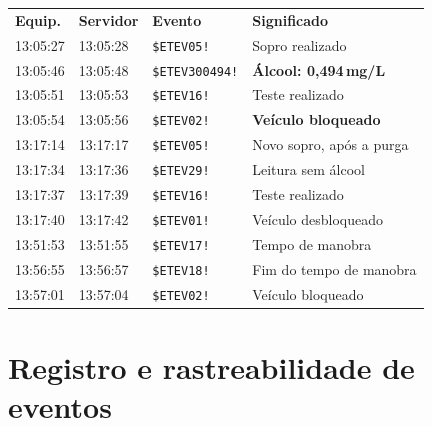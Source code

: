 \documentclass[a4paper,10pt]{article}
\newcommand{\thead}[1]{\textbf{\color{white}#1}}
\newcommand{\headrow}{\rowcolor{sdark}}
\begin{document}
\begin{multicols}{2}
\footnotesize
\begin{tabularx}{\linewidth}{@{}P{11.5mm}P{11.5mm}P{20mm}L@{}}
\headrow \thead{Equip.} & \thead{Servidor} & \thead{Evento} & \thead{Significado}\\
13:05:27 & 13:05:28 & \texttt{\$ETEV05!} & Sopro realizado\\
 13:05:46 & 13:05:48 & \texttt{\$ETEV300494!} & \textcolor{salert}{\textbf{Álcool: 0,494\,mg/L}}\\
13:05:51 & 13:05:53 & \texttt{\$ETEV16!} & Teste realizado\\
 13:05:54 & 13:05:56 & \texttt{\$ETEV02!} & \textbf{Veículo bloqueado}\\
13:17:14 & 13:17:17 & \texttt{\$ETEV05!} & Novo sopro, após a purga\\
 13:17:34 & 13:17:36 & \texttt{\$ETEV29!} & Leitura sem álcool\\
13:17:37 & 13:17:39 & \texttt{\$ETEV16!} & Teste realizado\\
 13:17:40 & 13:17:42 & \texttt{\$ETEV01!} & Veículo desbloqueado\\
13:51:53 & 13:51:55 & \texttt{\$ETEV17!} & Tempo de manobra\\
 13:56:55 & 13:56:57 & \texttt{\$ETEV18!} & Fim do tempo de manobra\\
13:57:01 & 13:57:04 & \texttt{\$ETEV02!} & Veículo bloqueado\\
\end{tabularx}
\normalsize
\end{multicols}

\section{Registro e rastreabilidade de eventos}
\end{document}
